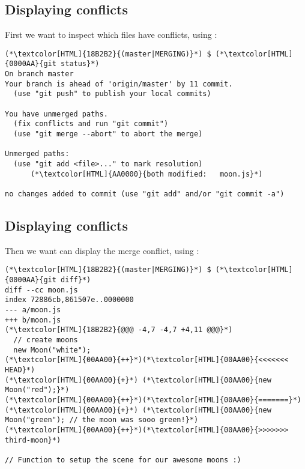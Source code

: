 \subsection{Displaying conflicts}
\begin{frame}[fragile]
  \subslidetitle

  First we want to inspect which files have conflicts, using :
  \begin{lstlisting}
(*\textcolor[HTML]{18B2B2}{(master|MERGING)}*) $ (*\textcolor[HTML]{0000AA}{git status}*)
On branch master
Your branch is ahead of 'origin/master' by 11 commit.
  (use "git push" to publish your local commits)

You have unmerged paths.
  (fix conflicts and run "git commit")
  (use "git merge --abort" to abort the merge)

Unmerged paths:
  (use "git add <file>..." to mark resolution)
      (*\textcolor[HTML]{AA0000}{both modified:   moon.js}*)

no changes added to commit (use "git add" and/or "git commit -a")
\end{lstlisting}
\end{frame}

\subsection{Displaying conflicts}
\begin{frame}[fragile]
  \subslidetitle

  Then we want can display the merge conflict, using :
  \begin{lstlisting}
(*\textcolor[HTML]{18B2B2}{(master|MERGING)}*) $ (*\textcolor[HTML]{0000AA}{git diff}*)
diff --cc moon.js
index 72886cb,861507e..0000000
--- a/moon.js
+++ b/moon.js
(*\textcolor[HTML]{18B2B2}{@@@ -4,7 -4,7 +4,11 @@@}*)
  // create moons
  new Moon("white");
(*\textcolor[HTML]{00AA00}{++}*)(*\textcolor[HTML]{00AA00}{<<<<<<< HEAD}*)
(*\textcolor[HTML]{00AA00}{+}*) (*\textcolor[HTML]{00AA00}{new Moon("red");}*)
(*\textcolor[HTML]{00AA00}{++}*)(*\textcolor[HTML]{00AA00}{=======}*)
(*\textcolor[HTML]{00AA00}{+}*) (*\textcolor[HTML]{00AA00}{new Moon("green"); // the moon was sooo green!}*)
(*\textcolor[HTML]{00AA00}{++}*)(*\textcolor[HTML]{00AA00}{>>>>>>> third-moon}*)

// Function to setup the scene for our awesome moons :)
\end{lstlisting}
\end{frame}

